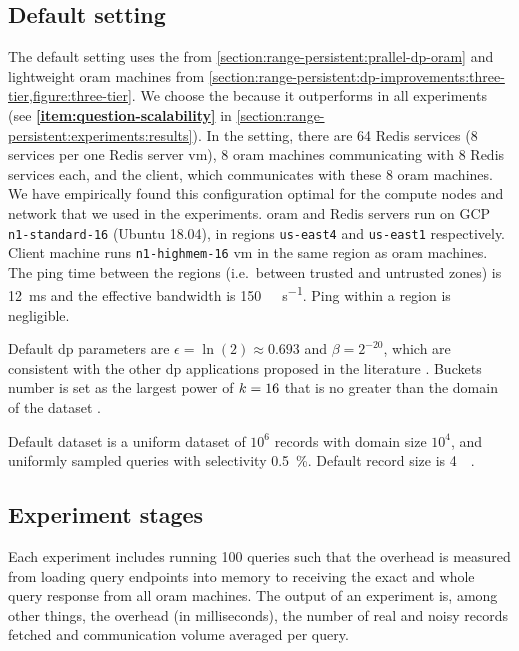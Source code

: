 	\subsection{Default setting}\label{section:range-persistent:experiments:default-setting}

		The default setting uses the \protocolGamma{} from \cref{section:range-persistent:prallel-dp-oram} and lightweight \acrshort{oram} machines from \cref{section:range-persistent:dp-improvements:three-tier,figure:three-tier}.
		We choose the \protocolGamma{} because it outperforms \protocolNoGamma{} in all experiments (see \textbf{\ref{item:question-scalability}} in \cref{section:range-persistent:experiments:results}).
		In the setting, there are 64 Redis services (8 services per one Redis server \acrshort{vm}), 8 \acrshort{oram} machines communicating with 8 Redis services each, and the client, which communicates with these 8 \acrshort{oram} machines.
		We have empirically found this configuration optimal for the compute nodes and network that we used in the experiments.
		\acrshort{oram} and Redis servers run on GCP \texttt{n1-standard-16}  (Ubuntu 18.04), in regions \texttt{us-east4} and \texttt{us-east1} respectively.
		Client machine runs \texttt{n1-highmem-16} \acrshort{vm} in the same region as \acrshort{oram} machines.
		The ping time between the regions (i.e.\ between trusted and untrusted zones) is \SI{12}{\milli\second} and the effective bandwidth is \SI{150}{\mega\byte\per\second}.
		Ping within a region is negligible.

		Default \acrshort{dp} parameters are $\epsilon = \ln(2) \approx \num{0.693}$ and $\beta = 2^{-20}$, which are consistent with the other \acrshort{dp} applications proposed in the literature \cite{choosing-epsilon}.
		Buckets number is set as the largest power of $k = 16$ that is no greater than the domain of the dataset \domainSize{}.

		Default dataset is a uniform dataset of $10^6$ records with domain size $10^4$, and uniformly sampled queries with selectivity \SI{0.5}{\percent}.
		Default record size is \SI{4}{\kibi\byte}.

	\subsection{Experiment stages}

		Each experiment includes running 100 queries such that the overhead is measured from loading query endpoints into memory to receiving the exact and whole query response from all \acrshort{oram} machines.
		The output of an experiment is, among other things, the overhead (in milliseconds), the number of real and noisy records fetched and communication volume averaged per query.


